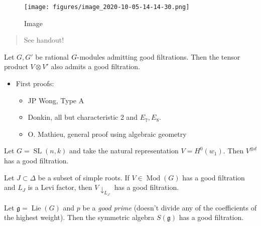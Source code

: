 \begin{figure}
\centering
\texttt{[image: figures/image\_2020-10-05-14-14-30.png]}
\caption{Image}
\end{figure}

\begin{quote}
See handout!
\end{quote}

\begin{theorem}[?]

Let \(G ,G'\) be rational \(G{\hbox{-}}\)modules admitting good
filtrations. Then the tensor product \(V\otimes V'\) also admits a good
filtration.

\end{theorem}

\begin{itemize}
\tightlist
\item
  First proofs:

  \begin{itemize}
  \tightlist
  \item
    JP Wong, Type A
  \item
    Donkin, all but characteristic 2 and \(E_7, E_8\).
  \item
    O. Mathieu, general proof using algebraic geometry
  \end{itemize}
\end{itemize}

\begin{example}

Let \(G = {\operatorname{SL}}(n, k)\) and take the natural
representation \(V = H^0(w_1)\). Then \(V^{\otimes d}\) has a good
filtration.

\end{example}

\begin{theorem}[?]

Let \(J\subset \Delta\) be a subset of simple roots. If
\(V \in {\operatorname{Mod}}(G)\) has a good filtration and \(L_J\) is a
Levi factor, then \(V{\downarrow_{L_J}}\) has a good filtration.

\end{theorem}

\begin{theorem}[?]

Let \({\mathfrak{g}}= \operatorname{Lie}(G)\) and \(p\) be a \emph{good
prime} (doesn't divide any of the coefficients of the highest weight).
Then the symmetric algebra \(S({\mathfrak{g}})\) has a good filtration.

\end{theorem}

